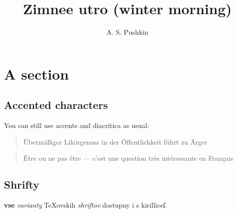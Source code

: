 \documentclass[a4paper,12pt]{article}
\author{A. S. Pushkin}
\title{{\cyr Zimnee utro} (winter morning)}
\begin{document}
\maketitle

\section{A section}


\subsection{Accented characters}
You can still use accents and diacritica as usual:
\begin{quote}
  \"Uberm\"a{\ss}iger Lik\"orgenuss in der \"Offentlichkeit f\"uhrt
  zu \"Arger 
\end{quote}
\begin{quote}
  \^Etre ou ne pas \^etre --- c'est une question tr\`es int\'eressante
  en Fran\c{c}ais
\end{quote}

\subsection{\cyr Shrifty}
 {\bf vse} {\em varianty} {\TeX}ovskih {\sl shriftov}
dostupny i s {\sf kirillice\U{i}}.
\end{document}
